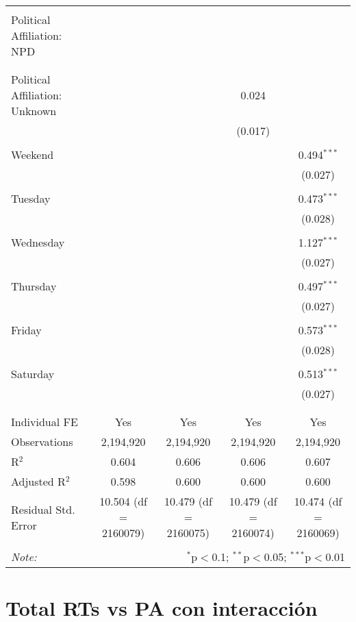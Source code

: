 \documentclass[
]{article}
\begin{document}
\begin{table}[!htbp]
{\begin{tabular}{@{\extracolsep{5pt}}lcccc}
  & & & & \\ 
 Political Affiliation: NPD &  &  &  &  \\ 
  &  &  &  &  \\ 
  & & & & \\ 
 Political Affiliation: Unknown &  &  & 0.024 &  \\ 
  &  &  & (0.017) &  \\ 
  & & & & \\ 
 Weekend &  &  &  & 0.494$^{***}$ \\ 
  &  &  &  & (0.027) \\ 
  & & & & \\ 
 Tuesday &  &  &  & 0.473$^{***}$ \\ 
  &  &  &  & (0.028) \\ 
  & & & & \\ 
 Wednesday &  &  &  & 1.127$^{***}$ \\ 
  &  &  &  & (0.027) \\ 
  & & & & \\ 
 Thursday &  &  &  & 0.497$^{***}$ \\ 
  &  &  &  & (0.027) \\ 
  & & & & \\ 
 Friday &  &  &  & 0.573$^{***}$ \\ 
  &  &  &  & (0.028) \\ 
  & & & & \\ 
 Saturday &  &  &  & 0.513$^{***}$ \\ 
  &  &  &  & (0.027) \\ 
  & & & & \\ 
\hline \\[-1.8ex] 
Individual FE & Yes & Yes & Yes & Yes \\ 
Observations & 2,194,920 & 2,194,920 & 2,194,920 & 2,194,920 \\ 
R$^{2}$ & 0.604 & 0.606 & 0.606 & 0.607 \\ 
Adjusted R$^{2}$ & 0.598 & 0.600 & 0.600 & 0.600 \\ 
Residual Std. Error & 10.504 (df = 2160079) & 10.479 (df = 2160075) & 10.479 (df = 2160074) & 10.474 (df = 2160069) \\ 
\hline 
\hline \\[-1.8ex] 
\textit{Note:}  & \multicolumn{4}{r}{$^{*}$p$<$0.1; $^{**}$p$<$0.05; $^{***}$p$<$0.01} \\ 
\end{tabular}
} 
\end{table} 
\newpage
\section{Total RTs vs PA con interacción}
\end{document}
